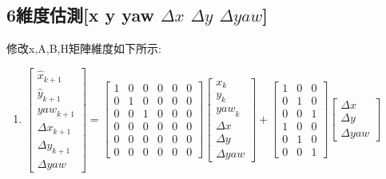 \documentclass{article}
\begin{document}
\subsection{6維度估測[x y yaw $\Delta{x}$ $\Delta{y}$ $\Delta{yaw}$]}
修改x,A,B,H矩陣維度如下所示:
\begin{enumerate}
	\item $\begin{bmatrix}  \hat{x}_{k+1} \\ \hat{y}_{k+1} \\ {yaw}_{k+1} \\ \Delta{x}_{k+1} \\ \Delta{y}_{k+1} \\ \Delta{yaw} \end{bmatrix}=\begin{bmatrix} 1 & 0 & 0 & 0 & 0 & 0 \\ 0 & 1 & 0 & 0 & 0 & 0 \\  0 & 0 & 1 & 0 & 0 & 0\\ 0 & 0 & 0 & 0 & 0 & 0\\ 0 & 0 & 0 & 0 & 0 & 0 \\ 0 & 0 & 0 & 0 & 0 & 0 \end{bmatrix}\begin{bmatrix} x_{k} \\ y_{k} \\ {yaw}_{k} \\ \Delta{x} \\ \Delta{y} \\ \Delta{yaw} \end{bmatrix}+\begin{bmatrix} 1 & 0 & 0 \\ 0 & 1 & 0 \\  0 & 0 & 1\\ 1 & 0 & 0\\ 0 & 1 & 0\\ 0 & 0 & 1\end{bmatrix}\begin{bmatrix} \Delta{x} \\ \Delta{y} \\ \Delta{yaw} \end{bmatrix}$
\end{enumerate}
\end{document}
